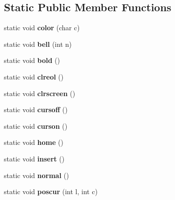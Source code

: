 \subsection*{Static Public Member Functions}
\begin{DoxyCompactItemize}
\item 
\mbox{\label{classConsole_a1254fa9dfc22b645b18ff8beffb92ada}} 
static void {\bfseries color} (char c)
\item 
\mbox{\label{classConsole_afc3a9b51e05728d4805421579a87f8c1}} 
static void {\bfseries bell} (int n)
\item 
\mbox{\label{classConsole_a12fdea03e68fdec66289329fd34111c9}} 
static void {\bfseries bold} ()
\item 
\mbox{\label{classConsole_a2ec015ca344b10710aa5cf2ff578e9fe}} 
static void {\bfseries clreol} ()
\item 
\mbox{\label{classConsole_a24f860d3d5cb225b664c33b21f22cf8b}} 
static void {\bfseries clrscreen} ()
\item 
\mbox{\label{classConsole_ac28051c7f6cd8f4bcaf0a8b8338cbaa9}} 
static void {\bfseries cursoff} ()
\item 
\mbox{\label{classConsole_accae861cddb51fde1c7a0000379270d1}} 
static void {\bfseries curson} ()
\item 
\mbox{\label{classConsole_ac6353601b974fc3d40ab4d1b29052f00}} 
static void {\bfseries home} ()
\item 
\mbox{\label{classConsole_ab9f1622719fd6006b5f23a25dc148109}} 
static void {\bfseries insert} ()
\item 
\mbox{\label{classConsole_a0af50381e547a4ad90b0fc5d82d3d9c0}} 
static void {\bfseries normal} ()
\item 
\mbox{\label{classConsole_a00f6a2d90f6788226f7640fbdc399be9}} 
static void {\bfseries poscur} (int l, int c)
\item 
\mbox{\label{classConsole_a8bbc999f5c03ee649261f395113f3327}} 

\end{DoxyCompactItemize}

